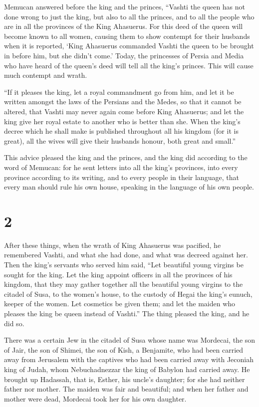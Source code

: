  Memucan answered before the king and the princes,
``Vashti the queen has not done wrong to just the king, but also to all
the princes, and to all the people who are in all the provinces of the
King Ahasuerus.  For this deed of the queen will become
known to all women, causing them to show contempt for their husbands
when it is reported, `King Ahasuerus commanded Vashti the queen to be
brought in before him, but she didn't come.'  Today, the
princesses of Persia and Media who have heard of the queen's deed will
tell all the king's princes. This will cause much contempt and wrath.

 ``If it pleases the king, let a royal commandment go
from him, and let it be written amongst the laws of the Persians and the
Medes, so that it cannot be altered, that Vashti may never again come
before King Ahasuerus; and let the king give her royal estate to another
who is better than she.  When the king's decree which he
shall make is published throughout all his kingdom (for it is great),
all the wives will give their husbands honour, both great and small.''

 This advice pleased the king and the princes, and the
king did according to the word of Memucan:  for he sent
letters into all the king's provinces, into every province according to
its writing, and to every people in their language, that every man
should rule his own house, speaking in the language of his own people.

\hypertarget{section-1}{%
\section{2}\label{section-1}}

 After these things, when the wrath of King Ahasuerus was
pacified, he remembered Vashti, and what she had done, and what was
decreed against her.  Then the king's servants who served
him said, ``Let beautiful young virgins be sought for the king.
 Let the king appoint officers in all the provinces of his
kingdom, that they may gather together all the beautiful young virgins
to the citadel of Susa, to the women's house, to the custody of Hegai
the king's eunuch, keeper of the women. Let cosmetics be given them;
 and let the maiden who pleases the king be queen instead
of Vashti.'' The thing pleased the king, and he did so.

 There was a certain Jew in the citadel of Susa whose name
was Mordecai, the son of Jair, the son of Shimei, the son of Kish, a
Benjamite,  who had been carried away from Jerusalem with
the captives who had been carried away with Jeconiah king of Judah, whom
Nebuchadnezzar the king of Babylon had carried away.  He
brought up Hadassah, that is, Esther, his uncle's daughter; for she had
neither father nor mother. The maiden was fair and beautiful; and when
her father and mother were dead, Mordecai took her for his own daughter.

